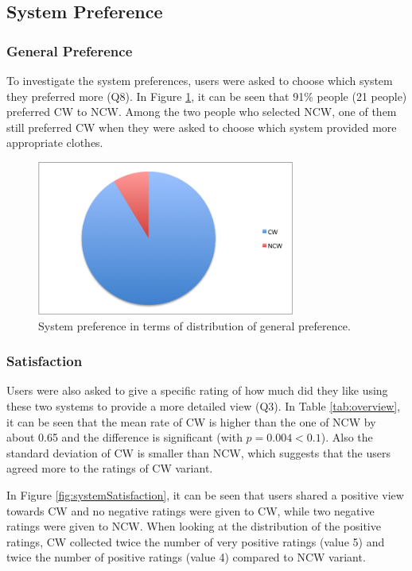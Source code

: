 \subsection{System Preference} \label{sec:results_sp}

\subsubsection{General Preference} \label{sec:results_sp_gp}

To investigate the system preferences, users were asked to choose which system they preferred more (Q8). In Figure \ref{fig:generalPreference}, it can be seen that 91\% people (21 people) preferred CW to NCW. Among the two people who selected NCW, one of them still preferred CW when they were asked to choose which system provided more appropriate clothes.

\begin{figure}[H]
	\centering
	\includegraphics[height=2in]{figures/generalPreference.png}
	\caption{System preference in terms of distribution of general preference.}
	\label{fig:generalPreference}
\end{figure}


\subsubsection{Satisfaction} \label{sec:results_sp_s}

Users were also asked to give a specific rating of how much did they like using these two systems to provide a more detailed view (Q3). In Table \ref{tab:overview}, it can be seen that the mean rate of CW is higher than the one of NCW by about 0.65 and the difference is significant (with $p = 0.004 < 0.1$). Also the standard deviation of CW is smaller than NCW, which suggests that the users agreed more to the ratings of CW variant.

In Figure \ref{fig:systemSatisfaction}, it can be seen that users shared a positive view towards CW and no negative ratings were given to CW, while two negative ratings were given to NCW. When looking at the distribution of the positive ratings, CW collected twice the number of very positive ratings (value 5) and twice the number of positive ratings (value 4) compared to NCW variant. 

